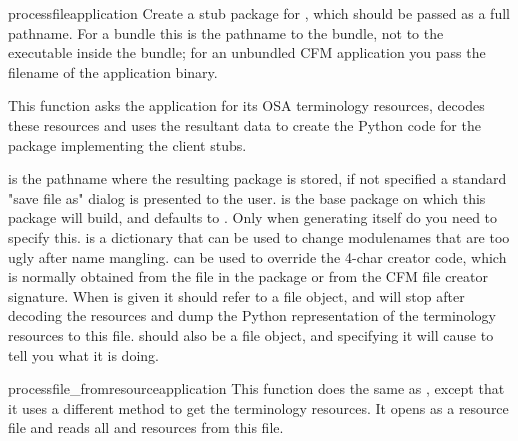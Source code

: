 \begin{funcdesc}{processfile}{application}
Create a stub package for , which should be passed as
a full pathname. For a  bundle this is the pathname to the
bundle, not to the executable inside the bundle; for an unbundled CFM
application you pass the filename of the application binary.

This function asks the application for its OSA terminology resources,
decodes these resources and uses the resultant data to create the Python
code for the package implementing the client stubs.

 is the pathname where the resulting package is stored, if
not specified a standard "save file as" dialog is presented to
the user.  is the base package on which this package
will build, and defaults to . Only when generating
 itself do you need to specify this.
 is a dictionary that can be used to change
modulenames that are too ugly after name mangling.
 can be used to override the 4-char creator
code, which is normally obtained from the  file in the
package or from the CFM file creator signature. When  is
given it should refer to a file object, and  will stop
after decoding the resources and dump the Python representation of the
terminology resources to this file.  should also be a file
object, and specifying it will cause  to tell you what
it is doing.
\end{funcdesc}

\begin{funcdesc}{processfile_fromresource}{application}
This function does the same as , except that it uses a
different method to get the terminology resources. It opens 
as a resource file and reads all  and  resources
from this file.
\end{funcdesc}

